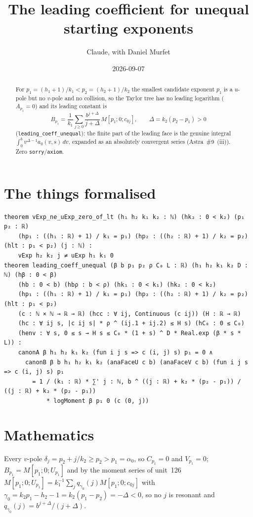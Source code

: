 \documentclass[11pt]{article}
\title{The leading coefficient for unequal starting exponents}
\author{Claude, with Daniel Murfet}
\date{2026-09-07}
\begin{document}
\maketitle
\sloppy

\begin{abstract}
For $p_1=(h_1+1)/k_1<p_2=(h_2+1)/k_2$ the smallest candidate exponent $p_1$ is a $u$-pole but no
$v$-pole and no collision, so the Taylor tree has no leading logarithm ($A_{p_1}=0$) and its leading
constant is
\[
B_{p_1}=\frac1{k_1}\sum_{j\ge0}\frac{b^{j+\Delta}}{j+\Delta}\,M[p_1;0;c_{0j}],\qquad\Delta=k_2(p_2-p_1)>0
\]
(\texttt{leading\_coeff\_unequal}): the finite part of the leading face is the genuine integral
$\int_0^bv^{\Delta-1}a_0(v,s)\,dv$, expanded as an absolutely convergent series (Astra~\#9~(iii)).
Zero \texttt{sorry}/\texttt{axiom}.
\end{abstract}

\section{The things formalised}
{\small
\begin{verbatim}
theorem vExp_ne_uExp_zero_of_lt (h₁ h₂ k₁ k₂ : ℕ) (hk₂ : 0 < k₂) (p₁ p₂ : ℝ)
    (hp₁ : ((h₁ : ℝ) + 1) / k₁ = p₁) (hp₂ : ((h₂ : ℝ) + 1) / k₂ = p₂) (hlt : p₁ < p₂) (j : ℕ) :
    vExp h₂ k₂ j ≠ uExp h₁ k₁ 0
theorem leading_coeff_unequal (β b p₁ p₂ ρ C₀ L : ℝ) (h₁ h₂ k₁ k₂ D : ℕ) (hβ : 0 < β)
    (hb : 0 < b) (hbρ : b < ρ) (hk₁ : 0 < k₁) (hk₂ : 0 < k₂)
    (hp₁ : ((h₁ : ℝ) + 1) / k₁ = p₁) (hp₂ : ((h₂ : ℝ) + 1) / k₂ = p₂) (hlt : p₁ < p₂)
    (c : ℕ × ℕ → ℝ → ℝ) (hcc : ∀ ij, Continuous (c ij)) (H : ℝ → ℝ)
    (hc : ∀ ij s, |c ij s| * ρ ^ (ij.1 + ij.2) ≤ H s) (hC₀ : 0 ≤ C₀)
    (henv : ∀ s, 0 ≤ s → H s ≤ C₀ * (1 + s) ^ D * Real.exp (β * s * L)) :
    canonA β h₁ h₂ k₁ k₂ (fun i j s => c (i, j) s) p₁ = 0 ∧
      canonB β b h₁ h₂ k₁ k₂ (anaFaceU c b) (anaFaceV c b) (fun i j s => c (i, j) s) p₁
        = 1 / (k₁ : ℝ) * ∑' j : ℕ, b ^ ((j : ℝ) + k₂ * (p₂ - p₁)) / ((j : ℝ) + k₂ * (p₂ - p₁))
            * logMoment β p₁ 0 (c (0, j))
\end{verbatim}
}

\section{Mathematics}

Every $v$-pole $\delta_j=p_2+j/k_2\ge p_2>p_1=\alpha_0$, so $C_{p_1}=0$ and $V_{p_1}=0$;
$B_{p_1}=M[p_1;0;U_{p_1}]$ and by the moment series of unit~126
$M[p_1;0;U_{p_1}]=k_1^{-1}\sum_jq_{\gamma_0}(j)M[p_1;0;c_{0j}]$ with
$\gamma_0=k_2p_1-h_2-1=k_2(p_1-p_2)=-\Delta<0$, so no $j$ is resonant and
$q_{\gamma_0}(j)=b^{j+\Delta}/(j+\Delta)$.
\end{document}
